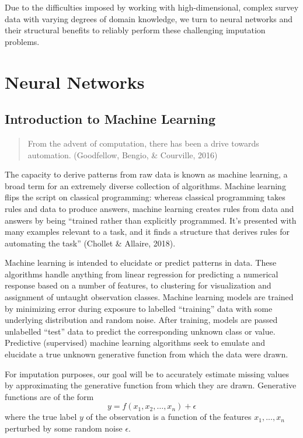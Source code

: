 \documentclass[12pt,twoside]{reedthesis}
\begin{document}
Due to the difficulties imposed by working with high-dimensional,
complex survey data with varying degrees of domain knowledge, we turn to
neural networks and their structural benefits to reliably perform these
challenging imputation problems.

\chapter{Neural Networks}\label{math-sci}

\section{Introduction to Machine
Learning}\label{introduction-to-machine-learning}
\begin{quote}
From the advent of computation, there has been a drive towards
automation. (Goodfellow, Bengio, \& Courville, 2016)
\end{quote}
The capacity to derive patterns from raw data is known as machine
learning, a broad term for an extremely diverse collection of
algorithms. Machine learning flips the script on classical programming:
whereas classical programming takes rules and data to produce answers,
machine learning creates rules from data and answers by being ``trained
rather than explicitly programmed. It's presented with many examples
relevant to a task, and it finds a structure that derives rules for
automating the task'' (Chollet \& Allaire, 2018).

Machine learning is intended to elucidate or predict patterns in data.
These algorithms handle anything from linear regression for predicting a
numerical response based on a number of features, to clustering for
visualization and assignment of untaught observation classes. Machine
learning models are trained by minimizing error during exposure to
labelled ``training'' data with some underlying distribution and random
noise. After training, models are passed unlabelled ``test'' data to
predict the corresponding unknown class or value. Predictive
(supervised) machine learning algorithms seek to emulate and elucidate a
true unknown generative function from which the data were drawn.

For imputation purposes, our goal will be to accurately estimate missing
values by approximating the generative function from which they are
drawn. Generative functions are of the form \[
y = f(x_1, x_2, \dots, x_n) + \epsilon
\] where the true label \(y\) of the observation is a function of the
features \(x_1, ..., x_n\) perturbed by some random noise \(\epsilon\).
\end{document}
